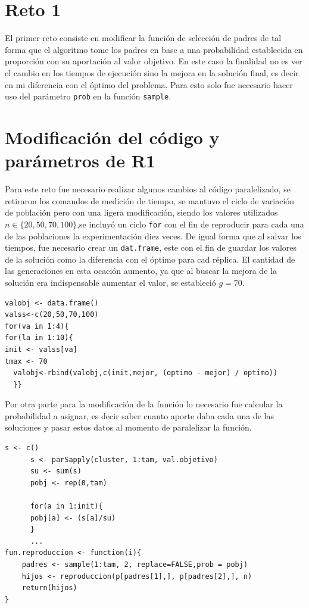 \documentclass[a4paper]{article}
\begin{document}
\section{Reto 1}
El primer reto consiste en modificar la función de selección de padres de tal forma que el algoritmo tome los padres en base a una probabilidad establecida en proporción con su aportación al valor objetivo. En este caso la finalidad no es ver el cambio en los tiempos de ejecución sino la mejora en la solución final, es decir en mi diferencia con el óptimo del problema. Para esto solo fue necesario hacer uso del parámetro \texttt{prob} en la función \texttt{sample}.

\section{Modificación del código y parámetros de R1}
Para este reto fue necesario realizar algunos cambios al código paralelizado, se retiraron los comandos de medición de tiempo, se mantuvo el ciclo de variación de población pero con una ligera modificación, siendo los valores utilizados $n\in\{20,50,70,100\}$,se incluyó un ciclo \texttt{for} con el fin de reproducir para cada una de las poblaciones la experimentación diez veces. De igual forma que al salvar los tiempos, fue necesario crear un \texttt{dat.frame}, este con el fin de guardar los valores de la solución como la diferencia con el óptimo para cad réplica. El cantidad de las generaciones en esta ocación aumento, ya que al buscar la mejora de la solución era indispensable aumentar el valor, se estableció $g=70$.
\begin{lstlisting}[frame=single]
valobj <- data.frame()
valss<-c(20,50,70,100)
for(va in 1:4){
for(la in 1:10){
init <- valss[va]
tmax <- 70
  valobj<-rbind(valobj,c(init,mejor, (optimo - mejor) / optimo))
  }}
\end{lstlisting}
Por otra parte para la modificación de la función lo necesario fue calcular la probabilidad a asignar, es decir saber cuanto aporte daba cada una de las soluciones y pasar estos datos al momento de paralelizar la función.
\begin{lstlisting}[frame=single]
      s <- c()
      s <- parSapply(cluster, 1:tam, val.objetivo)
      su <- sum(s)
      pobj <- rep(0,tam)
      
      for(a in 1:init){
      pobj[a] <- (s[a]/su)
      }
      ...
fun.reproduccion <- function(i){
	padres <- sample(1:tam, 2, replace=FALSE,prob = pobj)
	hijos <- reproduccion(p[padres[1],], p[padres[2],], n)
	return(hijos)
}
\end{lstlisting}
\end{document}
